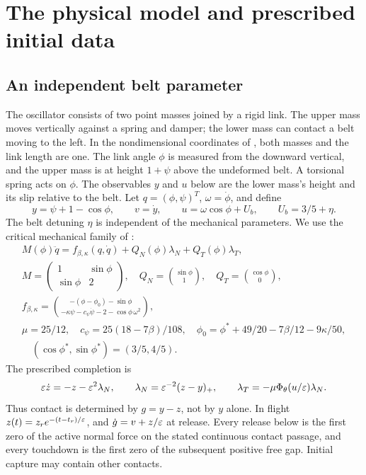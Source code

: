 \section{The physical model and prescribed initial data}
\label{sec:model}

\subsection{An independent belt parameter}
The oscillator consists of two point masses joined by a rigid link.
The upper mass moves vertically against a spring and damper; the lower
mass can contact a belt moving to the left. In the nondimensional
coordinates of \cite[Section~6.1]{NVC2018}, both masses and the link
length are one. The link angle $\phi$ is measured from the downward
vertical, and the upper mass is at height $1+\psi$ above the undeformed
belt. A torsional spring acts on $\phi$. The observables $y$ and $u$
below are the lower mass's height and its slip relative to the belt.
Let $q=(\phi,\psi)^T$, $\omega=\dot\phi$, and define
\begin{equation}
 y=\psi+1-\cos\phi,\qquad v=\dot y,
 \qquad u=\omega\cos\phi+U_b,\qquad U_b=3/5+\eta.
 \label{eq:bd-observables}
\end{equation}
The belt detuning $\eta$ is independent of the mechanical parameters.
We use the critical mechanical family of \cite[Section~6]{NVC2018}:
\begin{gather}
 M(\phi)\ddot q=f_{\beta,\kappa}(q,\dot q)
                  +Q_N(\phi)\lambda_N+Q_T(\phi)\lambda_T,
 \label{eq:bd-mechanics}\\
 M=\begin{pmatrix}1&\sin\phi\\\sin\phi&2\end{pmatrix},
 \quad Q_N=\binom{\sin\phi}{1},\quad Q_T=\binom{\cos\phi}{0},
 \nonumber\\
 f_{\beta,\kappa}=
 \binom{-(\phi-\phi_0)-\sin\phi}
       {-\kappa\psi-c_\psi\dot\psi-2-\cos\phi\,\omega^2},
 \nonumber\\
 \mu=25/12,\quad c_\psi=25(18-7\beta)/108,
 \quad\phi_0=\phi^*+49/20-7\beta/12-9\kappa/50,
 \nonumber\\
 \quad (\cos\phi^*,\sin\phi^*)=(3/5,4/5).
 \label{eq:bd-critical-family}
\end{gather}
The prescribed completion is
\begin{equation}
 \varepsilon\dot z=-z-\varepsilon^2\lambda_N,\qquad
 \lambda_N=\varepsilon^{-2}(z-y)_+,\qquad
 \lambda_T=-\mu\Phi_\theta(u/\varepsilon)\lambda_N.
 \label{eq:bd-completion}
\end{equation}
Thus contact is determined by $g=y-z$, not by $y$ alone.
In flight $z(t)=z_r e^{-(t-t_r)/\varepsilon}$, and
$\dot g=v+z/\varepsilon$ at release. Every release below is the first
zero of the active normal force on the stated continuous contact
passage, and every touchdown is the first zero of the subsequent
positive free gap. Initial capture may contain other contacts.

